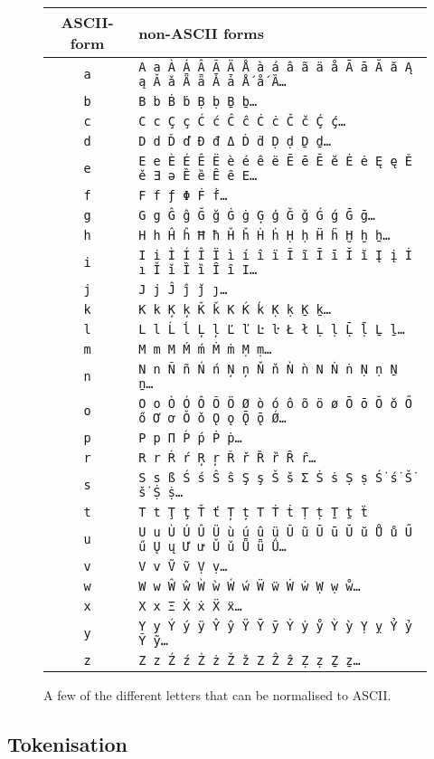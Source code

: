\begin{figure}
    \centering
    \begin{tabular}{|c|l|}
        \hline
        ASCII-form & non-ASCII forms\\
        \hline
        {\tt a} & {\tt A a À Á Â Ã Ä Å à á â ã ä å Ā ā Ă ă Ą ą Ǎ ǎ Ǟ ǟ Ǡ ǡ Ǻ ǻ Ȁ\ldots}\\
        {\tt b} & {\tt B b Ḃ ḃ Ḅ ḅ Ḇ ḇ\ldots}\\
        {\tt c} & {\tt C c Ç ç Ć ć Ĉ ĉ Ċ ċ Č č Ḉ ḉ\ldots}\\
        {\tt d} & {\tt D d Ď ď Đ đ Δ Ḋ ḋ Ḍ ḍ Ḏ ḏ\ldots}\\
        {\tt e} & {\tt E e È É Ê Ë è é ê ë Ē ē Ĕ ĕ Ė ė Ę ę Ě ě Ǝ ǝ Ȅ ȅ Ȇ ȇ Ε\ldots}\\
        {\tt f} & {\tt F f ƒ Φ Ḟ ḟ\ldots}\\
        {\tt g} & {\tt G g Ĝ ĝ Ğ ğ Ġ ġ Ģ ģ Ǧ ǧ Ǵ ǵ Ḡ ḡ\ldots}\\
        {\tt h} & {\tt H h Ĥ ĥ Ħ ħ Ȟ ȟ Ḣ ḣ Ḥ ḥ Ḧ ḧ Ḫ ḫ ẖ\ldots}\\
        {\tt i} & {\tt I i Ì Í Î Ï ì í î ï Ĩ ĩ Ī ī Ĭ ĭ Į į İ ı Ǐ ǐ Ȉ ȉ Ȋ ȋ Ι\ldots}\\
        {\tt j} & {\tt J j Ĵ ĵ ǰ ȷ\ldots}\\
        {\tt k} & {\tt K k Ķ ķ Ǩ ǩ Κ Ḱ ḱ Ḳ ḳ Ḵ ḵ\ldots}\\
        {\tt l} & {\tt L l Ĺ ĺ Ļ ļ Ľ ľ Ŀ ŀ Ł ł Ḷ ḷ Ḹ ḹ Ḻ ḻ\ldots}\\
        {\tt m} & {\tt M m Μ Ḿ ḿ Ṁ ṁ Ṃ ṃ\ldots}\\
        {\tt n} & {\tt N n Ñ ñ Ń ń Ņ ņ Ň ň Ǹ ǹ Ν Ṅ ṅ Ṇ ṇ Ṉ ṉ\ldots}\\
        {\tt o} & {\tt O o Ò Ó Ô Õ Ö Ø ò ó ô õ ö ø Ō ō Ŏ ŏ Ő ő Ơ ơ Ǒ ǒ Ǫ ǫ Ǭ ǭ Ǿ\ldots}\\
        {\tt p} & {\tt P p Π Ṕ ṕ Ṗ ṗ\ldots}\\
        {\tt r} & {\tt R r Ŕ ŕ Ŗ ŗ Ř ř Ȑ ȑ Ȓ ȓ\ldots}\\
        {\tt s} & {\tt S s ß Ś ś Ŝ ŝ Ş ş Š š Σ Ṡ ṡ Ṣ ṣ Ṥ ṥ Ṧ ṧ Ṩ ṩ\ldots}\\
        {\tt t} & {\tt T t Ţ ţ Ť ť Ț ț Τ Ṫ ṫ Ṭ ṭ Ṯ ṯ ẗ}\\
        {\tt u} & {\tt U u Ù Ú Û Ü ù ú û ü Ũ ũ Ū ū Ŭ ŭ Ů ů Ű ű Ų ų Ư ư Ǔ ǔ Ǖ ǖ Ǘ\ldots}\\
        {\tt v} & {\tt V v Ṽ ṽ Ṿ ṿ\ldots}\\
        {\tt w} & {\tt W w Ŵ ŵ Ẁ ẁ Ẃ ẃ Ẅ ẅ Ẇ ẇ Ẉ ẉ ẘ\ldots}\\
        {\tt x} & {\tt X x Ξ Ẋ ẋ Ẍ ẍ\ldots}\\
        {\tt y} & {\tt Y y Ý ý ÿ Ŷ ŷ Ÿ Ȳ ȳ Ẏ ẏ ẙ Ỳ ỳ Ỵ ỵ Ỷ ỷ Ỹ ỹ\ldots}\\
        {\tt z} & {\tt Z z Ź ź Ż ż Ž ž Ζ Ẑ ẑ Ẓ ẓ Ẕ ẕ\ldots}\\
        \hline
    \end{tabular}
    \caption{
        A few of the different letters that can be normalised to ASCII.
    }
    \label{alpha}
\end{figure}


\subsection{Tokenisation}